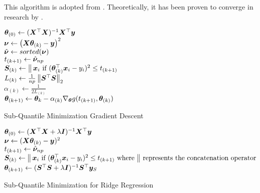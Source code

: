 \documentclass{article} %
\newcommand{\norm}[1]{\left\lVert#1\right\rVert}
\DeclareMathOperator*{\concat}{%
	\mathchoice%
	{\Big\Vert}%
	{\big\Vert}%
	{\Vert}%
	{\Vert}%
}
\begin{document}
	This algorithm is adopted from \cite{Razaviyayn}. Theoretically, it has been proven to converge in research by \cite{Jin_2019}.\\
	\begin{minipage}{0.48\textwidth}
	\begin{algorithm}[H]
		\DontPrintSemicolon
		
		${\bm{\theta}}_{(0)} \gets ({\bm{X}}^\top{\bm{X}})^{-1}{\bm{X}}^\top{\bm{y}}$\\
		{
			$\displaystyle {\bm{\nu}} \gets \left({\bm{X}}{\bm{\theta}}_{(k)} - {\bm{y}}\right)^2$\\
			{
				$\hat{{\bm{\nu}}} \gets sorted({\bm{\nu}})$\\
				$\displaystyle t_{(k+1)} \gets \hat{{\bm{\nu}}}_{np}$\\
			}
			$\mS_{(k)} \gets \concat \vx_i\text{ if } (\vtheta_{(k)}^\top \vx_i - y_i)^2 \leq t_{(k+1)}$\\
			$L_{(k)} \gets \frac{1}{np}\norm{\mS^\top\mS}_2$\\
			$\alpha_{(k)} \gets \frac{1}{2L_{(k)}}$\\
			$\displaystyle {\bm{\theta}}_{(k+1)} \gets {\bm{\theta}}_k - \alpha_{(k)} \nabla_{\bm{\theta}} g(t_{(k+1)},{\bm{\theta}}_{(k)})$
		}
		\caption{Sub-Quantile Minimization Gradient Descent}
		\label{alg:sqo1}
	\end{algorithm}
	\end{minipage}
	\hfill
	\begin{minipage}{0.48\textwidth}
		\begin{algorithm}[H]
			${\bm{\theta}}_{(0)} \gets ({\bm{X}}^\top{\bm{X}} + \lambda{\bm{I}})^{-1}{\bm{X}}^\top{\bm{y}}$\\
			{
				${\bm{\nu}} \gets ({\bm{X}} {\bm{\theta}}_{(k)} - {\bm{y}})^2$\\
				$t_{(k+1)} \gets \hat{{\bm{\nu}}}_{np}$\\
				$\mS_{(k)} \gets \concat \vx_i\text{ if } (\vtheta_{(k)}^\top \vx_i - y_i)^2 \leq t_{(k+1)} \text{ where $\concat$ represents the concatenation operator}$\\
				${\bm{\theta}}_{(k+1)} \gets ({\bm{S}}^\top{\bm{S}} + \lambda{\bm{I}})^{-1}{\bm{S}}^\top{\bm{y}}_S$\\
			}
			\caption{Sub-Quantile Minimization for Ridge Regression}
			\label{alg:sqo-ridge}
		\end{algorithm}
	\end{minipage}
		
\end{document}
